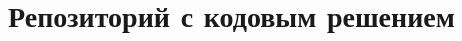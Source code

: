 \documentclass[times,specification,annotation]{itmo-student-thesis}
\begin{document}

\chapter{Репозиторий с кодовым решением}\label{sec:app:2}


\end{document}
